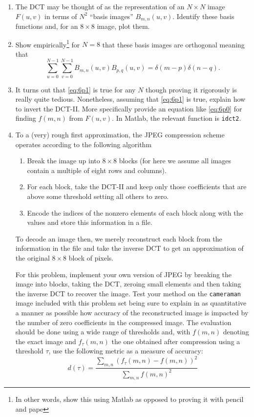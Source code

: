 \documentclass[11pt]{article}
\newcommand{\redtt}[1]{{\color{red} \texttt{#1}}}
\begin{document}
\begin{enumerate}
	\item The DCT may be thought of as the representation of an $N \times N$ image $F(u,v)$ in terms of $N^2$ ``basis images'' $B_{m,n}(u,v)$.  Identify these basis functions and, for an $8 \times 8$ image, plot them.
	
	\item Show empirically\footnote{In other words, show this using Matlab as opposed to proving it with pencil and pape} for $N=8$ that these basis images are orthogonal meaning that
	\begin{equation}
		\label{eq:6p1}
		\sum_{u=0}^{N-1}\sum_{v=0}^{N-1} B_{m,n}(u,v)B_{p,q}(u,v) = \delta(m-p)\delta(n-q).
	\end{equation}
	
	\item It turns out that \eqref{eq:6p1} is true for any $N$ though proving it rigorously is really quite tedious.  Nonetheless, assuming that \eqref{eq:6p1} is true, explain how to invert the DCT-II.  More specifically provide an equation like \eqref{eq:6p0} for finding $f(m,n)$ from $F(u,v)$. In Matlab, the relevant function is \redtt{idct2}. 
	
	\item To a (very) rough first approximation, the JPEG compression scheme operates according to the following algorithm 
	\begin{enumerate}
		\item Break the image up into $8 \times 8$ blocks (for here we assume all images contain a multiple of eight rows and columns).
		\item For each block, take the DCT-II and keep only those coefficients that are above some threshold setting all others to zero.
		\item Encode the indices of the nonzero elements of each block along with the values and store this information in a file.
	\end{enumerate}
	To decode an image then, we merely reconstruct each block from the information in the file and take the inverse DCT to get an approximation of the original $8 \times 8$ block of pixels.
	
	\vspace{.1in}
	
	For this problem, implement your own version of JPEG by breaking the image into blocks, taking the DCT, zeroing small elements and then taking the inverse DCT to recover the image.  Test your method on the \redtt{cameraman} image included with this problem set being sure to explain in as quantitative a manner as possible how accuracy of the reconstructed image is impacted by the number of zero coefficients in the compressed image.  The evaluation should be done using a wide range of thresholds and, with $f(m,n)$ denoting the exact image and $f_\tau(m,n)$ the one obtained after compression using a threshold $\tau$, use the following metric as a measure of accuracy:
	   \begin{displaymath}
			d(\tau) = \frac{\sum_{m,n} ({f}_{\tau}(m,n)-f(m,n))^2}
	{\sum_{m,n} f(m,n)^2}
	\end{displaymath}
	
\end{enumerate}
\end{document}
